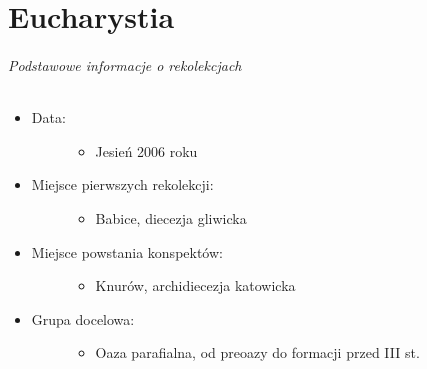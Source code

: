 \documentclass[a5paper,10pt,polish]{book}
\begin{document}
\part{Eucharystia}
\label{babice2006-jesien-knurow/index::doc}\label{babice2006-jesien-knurow/index:eucharystia}\paragraph{Podstawowe informacje o rekolekcjach}
\begin{itemize}
\item {} \begin{description}
\item[{Data:}] \leavevmode\begin{itemize}
\item {} 
Jesień 2006 roku

\end{itemize}

\end{description}

\item {} \begin{description}
\item[{Miejsce pierwszych rekolekcji:}] \leavevmode\begin{itemize}
\item {} 
Babice, diecezja gliwicka

\end{itemize}

\end{description}

\item {} \begin{description}
\item[{Miejsce powstania konspektów:}] \leavevmode\begin{itemize}
\item {} 
Knurów, archidiecezja katowicka

\end{itemize}

\end{description}

\item {} \begin{description}
\item[{Grupa docelowa:}] \leavevmode\begin{itemize}
\item {} 
Oaza parafialna, od preoazy do formacji przed III st.

\end{itemize}


\end{description}
\end{itemize}
\end{document}
